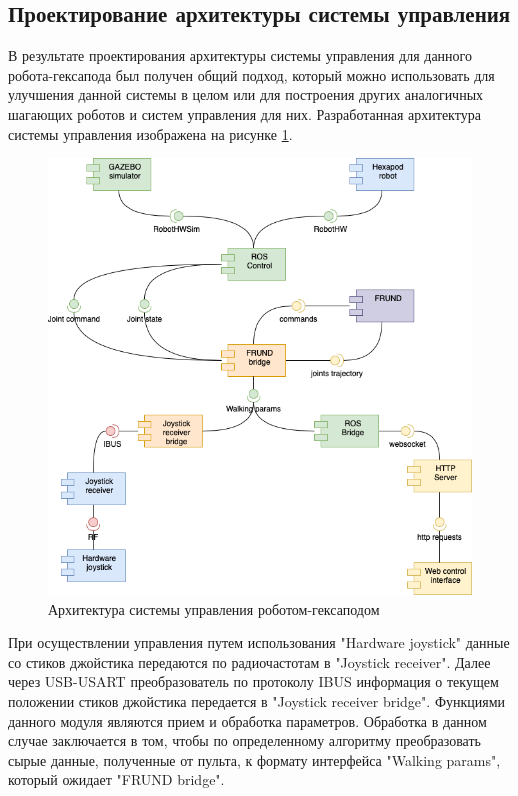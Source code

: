 \subsection{Проектирование архитектуры системы управления}

В результате проектирования архитектуры системы управления для данного робота-гексапода был получен общий подход, который можно использовать для улучшения данной системы в целом или для построения других аналогичных шагающих роботов и систем управления для них. Разработанная архитектура системы управления изображена на рисунке \ref{img:architecture}.

\begin{figure}[]
	\centering
	\includegraphics[width = \linewidth]{img/architecture}
	\caption{Архитектура системы управления роботом-гексаподом}
	\label{img:architecture}
\end{figure}

При осуществлении управления путем использования "Hardware joystick"{} данные со стиков джойстика передаются по радиочастотам в "Joystick receiver"{}. Далее через USB-USART преобразователь по протоколу IBUS информация о текущем положении стиков джойстика передается в "Joystick receiver bridge"{}. Функциями данного модуля являются прием и обработка параметров. Обработка в данном случае заключается в том, чтобы по определенному алгоритму преобразовать сырые данные, полученные от пульта, к формату интерфейса "Walking params"{}, который ожидает "FRUND bridge"{}.

